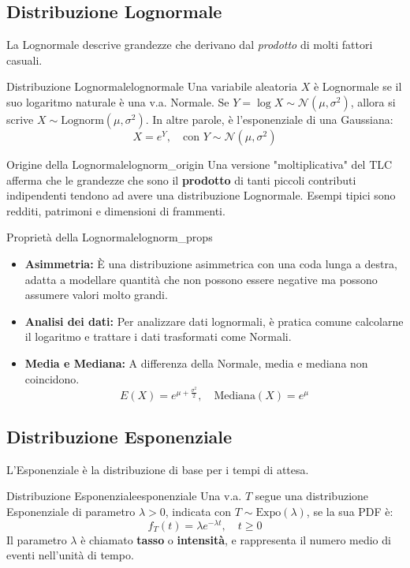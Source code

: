 \subsection{Distribuzione Lognormale}
La Lognormale descrive grandezze che derivano dal \emph{prodotto} di molti fattori casuali.

\begin{definizione}{Distribuzione Lognormale}{lognormale}
Una variabile aleatoria \(X\) è Lognormale se il suo logaritmo naturale è una v.a. Normale. Se \(Y = \log X \sim \mathcal{N}(\mu, \sigma^2)\), allora si scrive \(X \sim \text{Lognorm}(\mu, \sigma^2)\). In altre parole, è l'esponenziale di una Gaussiana:
\[ X = e^Y, \quad \text{con } Y \sim \mathcal{N}(\mu, \sigma^2) \]
\end{definizione}

\begin{nota}{Origine della Lognormale}{lognorm_origin}
Una versione "moltiplicativa" del TLC afferma che le grandezze che sono il \textbf{prodotto} di tanti piccoli contributi indipendenti tendono ad avere una distribuzione Lognormale. Esempi tipici sono redditi, patrimoni e dimensioni di frammenti.
\end{nota}

\begin{proposizione}{Proprietà della Lognormale}{lognorm_props}
\begin{itemize}
    \item \textbf{Asimmetria:} È una distribuzione asimmetrica con una coda lunga a destra, adatta a modellare quantità che non possono essere negative ma possono assumere valori molto grandi.
    \item \textbf{Analisi dei dati:} Per analizzare dati lognormali, è pratica comune calcolarne il logaritmo e trattare i dati trasformati come Normali.
    \item \textbf{Media e Mediana:} A differenza della Normale, media e mediana non coincidono.
    \[ E(X) = e^{\mu + \frac{\sigma^2}{2}}, \quad \text{Mediana}(X) = e^\mu \]
\end{itemize}
\end{proposizione}

\subsection{Distribuzione Esponenziale}
L'Esponenziale è la distribuzione di base per i tempi di attesa.

\begin{definizione}{Distribuzione Esponenziale}{esponenziale}
Una v.a. \(T\) segue una distribuzione Esponenziale di parametro \(\lambda > 0\), indicata con \(T \sim \text{Expo}(\lambda)\), se la sua PDF è:
\[
f_T(t) = \lambda e^{-\lambda t}, \quad t \ge 0
\]
Il parametro \(\lambda\) è chiamato \textbf{tasso} o \textbf{intensità}, e rappresenta il numero medio di eventi nell'unità di tempo.
\end{definizione}

